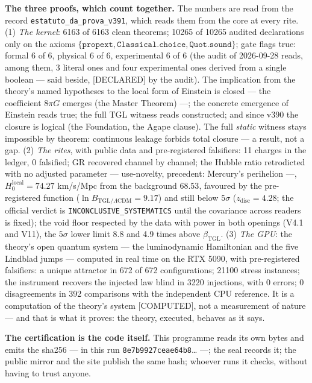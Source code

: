 \documentclass[11pt]{article}
\theoremstyle{definition}\newtheorem{deriv}{Derivation}
\begin{document}
\textbf{The three proofs, which count together.} The numbers are read from the record \texttt{estatuto\_da\_prova\_v391}, which reads them from the core at every rite. (1) \emph{The kernel}: 6163 of 6163 clean theorems; 10265 of 10265 audited declarations only on the axioms $\{\texttt{propext},\texttt{Classical.choice},\texttt{Quot.sound}\}$; gate flags true: formal 6 of 6, physical 6 of 6, experimental 6 of 6 (the audit of 2026-09-28 reads, among them, 3 literal ones and four experimental ones derived from a single boolean --- said beside, \textsf{[DECLARED]} by the audit). The implication from the theory's named hypotheses to the local form of Einstein is closed --- the coefficient $8\pi G$ emerges (the Master Theorem) ---; the concrete emergence of Einstein reads true; the full TGL witness reads constructed; and since v390 the closure is logical (the Foundation, the Agape clause). The full \emph{static} witness stays impossible by theorem: continuous leakage forbids total closure --- a result, not a gap. (2) \emph{The rites}, with public data and pre-registered falsifiers: 11 charges in the ledger, 0 falsified; GR recovered channel by channel; the Hubble ratio retrodicted with no adjusted parameter --- use-novelty, precedent: Mercury's perihelion ---, $H_0^{\mathrm{local}}=74.27$ km/s/Mpc from the background $68.53$, favoured by the pre-registered function ($\ln B_{\mathrm{TGL}/\Lambda\mathrm{CDM}}=9.17$) and still below $5\sigma$ ($z_{\mathrm{disc}}=4.28$; the official verdict is \texttt{INCONCLUSIVE\_SYSTEMATICS} until the covariance across readers is fixed); the void floor respected by the data with power in both openings (V4.1 and V11), the $5\sigma$ lower limit 8.8 and 4.9 times above $\beta_{\mathrm{TGL}}$. (3) \emph{The GPU}: the theory's open quantum system --- the luminodynamic Hamiltonian and the five Lindblad jumps --- computed in real time on the RTX 5090, with pre-registered falsifiers: a unique attractor in 672 of 672 configurations; 21100 stress instances; the instrument recovers the injected law blind in 3220 injections, with 0 errors; 0 disagreements in 392 comparisons with the independent CPU reference. It is a computation of the theory's system \textsf{[COMPUTED]}, not a measurement of nature --- and that is what it proves: the theory, executed, behaves as it says.

\textbf{The certification is the code itself.} This programme reads its own bytes and emits the sha256 --- in this run \texttt{8e7b9927ceae64b8}… ---; the seal records it; the public mirror and the site publish the same hash; whoever runs it checks, without having to trust anyone.
\end{document}
